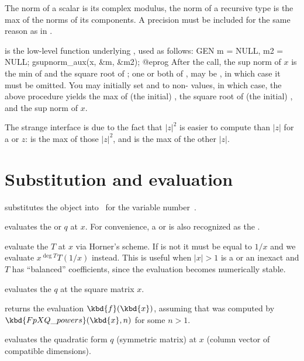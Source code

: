  The norm of a scalar is its complex
modulus, the norm of a recursive type is the max of the norms of its
components. A precision  must be included for the same reason as in
.

is the low-level function underlying
, used as follows:
\bprog
  GEN m = NULL, m2 = NULL;
  gsupnorm_aux(x, &m, &m2);
@eprog
After the call, the sup norm of $x$ is the min of  and the square root
of ;  one or both of ,  may be , in
which case it must be omitted. You may initially set  and  to
non- values, in which case, the above procedure yields the max of
(the initial) , the square root of (the initial) , and the sup
norm of $x$.

The strange interface is due to the fact that $|z|^2$ is easier to compute
than $|z|$ for a  or  $z$:  is the max of
those $|z|^2$, and  is the max of the other $|z|$.

\section{Substitution and evaluation}

 substitutes the object 
into~ for the variable number~.

 evaluates the  or 
$q$ at $x$. For convenience, a  or  is also recognized as
the  .

 evaluate the  $T$
at $x$ via Horner's scheme. If  is not  it must be equal to
$1/x$ and we evaluate $x^{\deg T}T(1/x)$ instead. This is useful when
$|x| > 1$ is a  or an inexact  and $T$ has
``balanced'' coefficients, since the evaluation becomes numerically stable.

 evaluates the  $q$ at the
square matrix $x$.

 returns
the evaluation $\kbd{f}(\kbd{x})$, assuming that  was computed by
$\kbd{FpXQ\_powers}(\kbd{x}, n)$ for some $n>1$.

 evaluates the quadratic form
$q$ (symmetric matrix) at $x$ (column vector of compatible dimensions).

